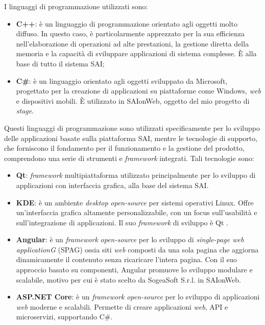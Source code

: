     \noindent I linguaggi di programmazione utilizzati sono:
    \begin{itemize}
        \item \textbf{C++}: è un linguaggio di programmazione orientato agli oggetti molto diffuso. In questo caso, è particolarmente apprezzato per la sua efficienza nell'elaborazione di operazioni ad alte prestazioni, la gestione diretta della memoria e la capacità di sviluppare applicazioni di sistema complesse. È alla base di tutto il sistema SAI;
        \item \textbf{C\#}: è un linguaggio orientato agli oggetti sviluppato da Microsoft, progettato per la creazione di applicazioni su piattaforme come Windows, \textit{web} e dispositivi mobili. È utilizzato in SAIonWeb, oggetto del mio progetto di \textit{stage}.
    \end{itemize}
    Questi linguaggi di programmazione sono utilizzati specificamente per lo sviluppo delle applicazioni basate sulla piattaforma SAI, mentre le tecnologie di supporto, che forniscono il fondamento per il funzionamento e la gestione del prodotto, comprendono una serie di strumenti e \textit{framework} integrati. Tali tecnologie sono:

    \begin{itemize}
        \item \textbf{Qt}: \textit{framework} multipiattaforma utilizzato principalmente per lo sviluppo di applicazioni con interfaccia grafica, alla base del sistema SAI.
        \item \textbf{KDE}: è un ambiente \textit{desktop} \textit{open-source} per sistemi operativi Linux. Offre un'interfaccia grafica altamente personalizzabile, con un focus sull'usabilità e sull'integrazione di applicazioni. Il suo \textit{framework} di sviluppo è Qt .
        \item \textbf{Angular}: è un \textit{framework} \textit{open-source} per lo sviluppo di \textit{single-page web applicationG} (SPAG) ossia siti \textit{web} composti da una sola pagina che aggiorna dinamicamente il contenuto senza ricaricare l'intera pagina. Con il suo approccio basato su componenti, Angular promuove lo sviluppo modulare e scalabile, motivo per cui è stato scelto da SogeaSoft S.r.l. in SAIonWeb. 
        \item \textbf{ASP.NET Core}: è un \textit{framework} \textit{open-source} per lo sviluppo di applicazioni \textit{web} moderne e scalabili. Permette di creare applicazioni \textit{web}, API e microservizi, supportando C\#.
    \end{itemize}


